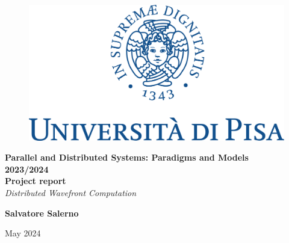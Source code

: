 \documentclass[11pt]{report}
\begin{document}
\begin{titlepage}

\begin{figure}
    \centering\includegraphics[scale=0.5]{img/marchio_unipi 3.png}
\end{figure}

\begin{center}
    \Huge{\textbf{Parallel and Distributed Systems: Paradigms and Models}\\
    \textbf{2023/2024}}\\
    \Huge{\textbf{Project report}}\\
    \vspace{5mm}
    \textit{\huge{Distributed Wavefront Computation}}\par
\end{center}



\begin{center}
    \vspace{120mm}
    {\bf\huge{Salvatore Salerno}}
    \par
    \huge May 2024
\end{center}
\end{titlepage}

\cleardoublepage
{}
\cleardoublepage
{}





\end{document}
